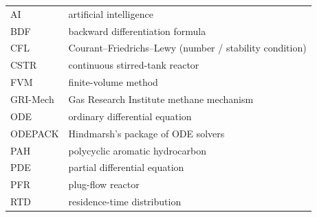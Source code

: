 \begin{longtable}{@{} p{} p{} @{}}
AI       & artificial intelligence                                                 \\
BDF      & backward differentiation formula                                        \\
CFL      & Courant--Friedrichs--Lewy (number / stability condition)                \\
CSTR     & continuous stirred-tank reactor                                         \\
FVM      & finite-volume method                                                    \\
GRI-Mech & Gas Research Institute methane mechanism                                \\
ODE      & ordinary differential equation                                          \\
ODEPACK  & Hindmarsh's package of ODE solvers                                      \\
PAH      & polycyclic aromatic hydrocarbon                                         \\
PDE      & partial differential equation                                           \\
PFR      & plug-flow reactor                                                       \\
RTD      & residence-time distribution                                             \\
\end{longtable}
